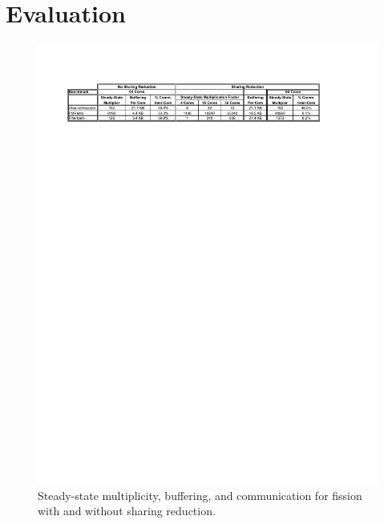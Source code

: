\section{Evaluation}
\label{sec:eval}

\begin{figure}[t]
\centering
\includegraphics[width=6.1in]{figures/big-table.pdf}
\caption{\label{fig:big-table}  Steady-state multiplicity, buffering,
  and communication for fission with and without sharing reduction.}
\end{figure}


